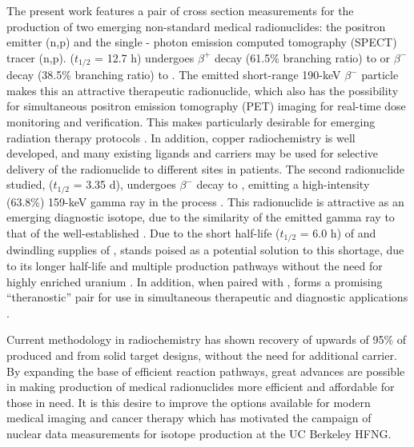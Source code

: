 \documentclass[5p]{elsarticle}
\newcommand{\comment}[1]{\todo[color=blue!20!white,inline]{ASV: #1}}
\begin{document}
The present work features a pair of cross section measurements for the production of two emerging non-standard medical radionuclides: the positron emitter (n,p) and the single - photon emission computed tomography (SPECT) tracer (n,p).
  ($t_{1/2}$ = 12.7 h) undergoes $\beta^+$ decay (61.5\% branching ratio) to  or $\beta^-$ decay (38.5\% branching ratio) to  \cite{Singh2007}.
The emitted short-range 190-keV $\beta^-$ particle makes this an  attractive  therapeutic radionuclide, which also has the possibility for simultaneous positron emission tomography (PET) imaging for real-time dose monitoring and verification.
This makes  particularly desirable  for emerging radiation therapy protocols \cite{Lewis2003,NSACIsotopesSubcommittee2015,Bandari2014,mp500671j}.
In addition, copper radiochemistry is well developed, and many existing ligands and carriers may be used for selective delivery of the radionuclide to different sites in patients.
The second radionuclide studied,  ($t_{1/2}$ = 3.35 d), undergoes $\beta^-$ decay to , emitting a high-intensity (63.8\%) 159-keV gamma ray in the process \cite{Burrows2007}.
This radionuclide is  attractive as an emerging diagnostic isotope, due to the similarity of the emitted gamma ray to that of the  well-established  \cite{Qaim2011,Qaim201731,Kolsky1998,mausner1995evaluation}.
Due to the short half-life ($t_{1/2}$ = 6.0 h) of and dwindling supplies of ,  stands poised as a potential solution to this shortage, due to its longer half-life and multiple production pathways without the need for highly enriched uranium \cite{Browne2011}.
In addition, when paired with ,  forms a promising \enquote{theranostic} pair for use in simultaneous therapeutic and diagnostic applications \cite{Muller2014,Deilami-nezhad2016}.




Current methodology in radiochemistry has shown recovery of upwards of 95\% of produced  \cite{bhatki1969preparation,mirzadeh1992spontaneous} and  \cite{Aly1971,Bokhari2010,BF02047448} from solid target designs, without the need for additional carrier.
By expanding the base of efficient reaction pathways, great advances are possible in making production of medical radionuclides more efficient and affordable for those in need.  It is this desire to improve the options available for modern medical imaging and cancer therapy which has motivated the campaign of nuclear data measurements for isotope production at the UC Berkeley HFNG.
\end{document}
